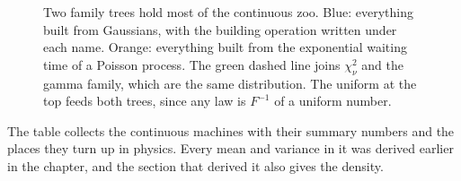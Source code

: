 \begin{figure}[htbp]
\caption{Two family trees hold most of the continuous zoo. Blue: everything built from Gaussians, with the building operation written under each name. Orange: everything built from the exponential waiting time of a Poisson process. The green dashed line joins $\chi^2_\nu$ and the gamma family, which are the same distribution. The uniform at the top feeds both trees, since any law is $F^{-1}$ of a uniform number.}
\label{2b:fig:family}
\end{figure}

The table collects the continuous machines with their summary numbers and the places they turn up in physics. Every mean and variance in it was derived earlier in the chapter, and the section that derived it also gives the density.

